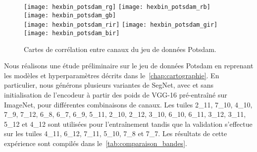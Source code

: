 \begin{figure}[h]
  \texttt{[image: hexbin\_potsdam\_rg]}
  \texttt{[image: hexbin\_potsdam\_rb]}
  \texttt{[image: hexbin\_potsdam\_gb]}\\
  \texttt{[image: hexbin\_potsdam\_rir]}
  \texttt{[image: hexbin\_potsdam\_gir]}
  \texttt{[image: hexbin\_potsdam\_bir]}
  \caption{Cartes de corrélation entre canaux du jeu de données  Potsdam.}
  \label{fig:potsdam_correlations}
\end{figure}

Nous réalisons une étude préliminaire sur le jeu de données  Potsdam en reprenant les modèles et hyperparamètres décrits dans le~\cref{chap:cartographie}. En particulier, nous générons plusieurs variantes de SegNet, avec et sans initialisation de l'encodeur à partir des poids de VGG-16 pré-entraîné sur ImageNet, pour différentes combinaisons de canaux. Les tuiles 2\_11, 7\_10, 4\_10, 7\_9, 7\_12, 6\_8, 6\_7, 6\_9, 5\_11, 2\_10, 2\_12, 3\_10, 6\_10, 6\_11, 3\_12, 3\_11, 5\_12 et 4\_12 sont utilisées pour l'entraînement tandis que la validation s'effectue sur les tuiles 4\_11, 6\_12, 7\_11, 5\_10, 7\_8 et 7\_7. Les résultats de cette expérience sont compilés dans le~\cref{tab:comparaison_bandes}.

